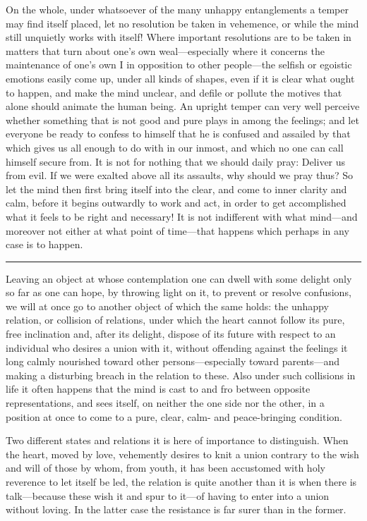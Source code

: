 \documentclass[12pt,a4paper]{book}
\begin{document}
On the whole, under whatsoever of the many unhappy entanglements a temper
may find itself placed, let no resolution be taken in vehemence, or while
the mind still unquietly works with itself! Where important resolutions are
to be taken in matters that turn about one's own weal---especially where it
concerns the maintenance of one's own I in opposition to other people---the
selfish or egoistic emotions easily come up, under all kinds of shapes,
even if it is clear what ought to happen, and make the mind unclear, and
defile or pollute the motives that alone should animate the human being. An
upright temper can very well perceive whether something that is not good
and pure plays in among the feelings; and let everyone be ready to confess
to himself that he is confused and assailed by that which gives us all
enough to do with in our inmost, and which no one can call himself secure
from. It is not for nothing that we should daily pray: Deliver us from
evil. If we were exalted above all its assaults, why should we pray thus?
So let the mind then first bring itself into the clear, and come to inner
clarity and calm, before it begins outwardly to work and act, in order to
get accomplished what it feels to be right and necessary! It is not
indifferent with what mind---and moreover not either at what point of
time---that happens which perhaps in any case is to happen.
\begin{center}\rule{0.28\linewidth}{0.4pt}\end{center}

Leaving an object at whose contemplation one can dwell with some delight
only so far as one can hope, by throwing light on it, to prevent or resolve
confusions, we will at once go to another object of which the same holds:
the unhappy relation, or collision of relations, under which the heart
cannot follow its pure, free inclination and, after its delight, dispose of
its future with respect to an individual who desires a union with it,
without offending against the feelings it long calmly nourished toward
other persons---especially toward parents---and making a disturbing breach
in the relation to these. Also under such collisions in life it often
happens that the mind is cast to and fro between opposite representations,
and sees itself, on neither the one side nor the other, in a position at
once to come to a pure, clear, calm- and peace-bringing condition.

Two different states and relations it is here of importance to distinguish.
When the heart, moved by love, vehemently desires to knit a union contrary
to the wish and will of those by whom, from youth, it has been accustomed
with holy reverence to let itself be led, the relation is quite another
than it is when there is talk---because these wish it and spur to it---of
having to enter into a union without loving. In the latter case the
resistance is far surer than in the former.
\end{document}
